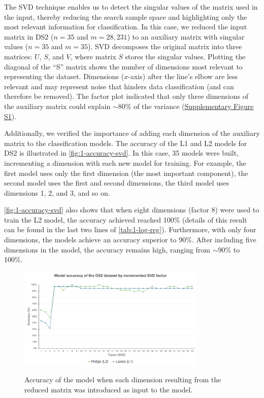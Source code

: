 The SVD technique enables us to detect the singular values of the matrix used in the input, thereby reducing the search sample space and highlighting only the most relevant information for classification. In this case, we reduced the input matrix in DS2 ($n = 35$ and $m = 28,231$) to an auxiliary matrix with singular values ($n = 35$ and $m = 35$). SVD decomposes the original matrix into three matrices: $U$, $S$, and $V$, where matrix $S$ stores the singular values. Plotting the diagonal of the ``S'' matrix shows the number of dimensions most relevant to representing the dataset. Dimensions ($x$-axis) after the line's elbow are less relevant and may represent noise that hinders data classification (and can therefore be removed). The factor plot indicated that only three dimensions of the auxiliary matrix could explain $\sim$80\% of the variance (\href{https://github.com/LBS-UFMG/asthma_microarray/blob/main/supplementary_material.pdf}{Supplementary Figure S1}).

Additionally, we verified the importance of adding each dimension of the auxiliary matrix to the classification models. The accuracy of the L1 and L2 models for DS2 is illustrated in \autoref{fig:1-accuracy-svd}. In this case, 35 models were built, incrementing a dimension with each new model for training. For example, the first model uses only the first dimension (the most important component), the second model uses the first and second dimensions, the third model uses dimensions 1, 2, and 3, and so on.

\autoref{fig:1-accuracy-svd} also shows that when eight dimensions (factor 8) were used to train the L2 model, the accuracy achieved reached 100\% (details of this result can be found in the last two lines of \autoref{tab:1-log-reg}). Furthermore, with only four dimensions, the models achieve an accuracy superior to 90\%. After including five dimensions in the model, the accuracy remains high, ranging from $\sim$90\% to 100\%.

\begin{figure}[htbp] \centering
  \includegraphics[width=0.8\textwidth]{figures/1-accuracy_svd.png}
  \label{fig:1-accuracy-svd}
  \caption{Accuracy of the model when each dimension resulting from the reduced matrix was introduced as input to the model.}
\end{figure} %

